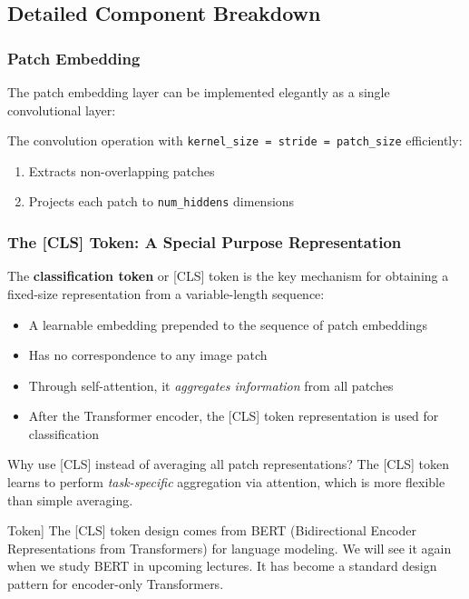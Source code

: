 \documentclass{article}
\begin{document}
\subsection{Detailed Component Breakdown}

\subsubsection{Patch Embedding}

The patch embedding layer can be implemented elegantly as a single convolutional layer:


The convolution operation with \texttt{kernel\_size = stride = patch\_size} efficiently:
\begin{enumerate}
\item Extracts non-overlapping patches
\item Projects each patch to \texttt{num\_hiddens} dimensions
\end{enumerate}

\subsubsection{The [CLS] Token: A Special Purpose Representation}

The \textbf{classification token} or [CLS] token is the key mechanism for obtaining a fixed-size representation from a variable-length sequence:

\begin{itemize}
\item A learnable embedding prepended to the sequence of patch embeddings
\item Has no correspondence to any image patch
\item Through self-attention, it \textit{aggregates information} from all patches
\item After the Transformer encoder, the [CLS] token representation is used for classification
\end{itemize}

Why use [CLS] instead of averaging all patch representations? The [CLS] token learns to perform \textit{task-specific} aggregation via attention, which is more flexible than simple averaging.

\begin{tcolorbox}[colback=blue!5!white, colframe=blue!50!black, title=Note on [CLS] Token]
The [CLS] token design comes from BERT (Bidirectional Encoder Representations from Transformers) for language modeling. We will see it again when we study BERT in upcoming lectures. It has become a standard design pattern for encoder-only Transformers.
\end{tcolorbox}
\end{document}

